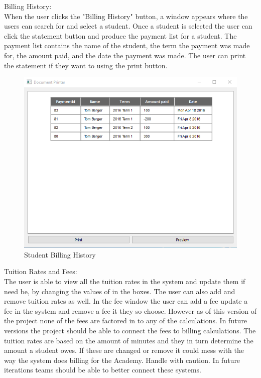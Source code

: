 Billing History:\\
When the user clicks the "Billing History" button, a window appears where the users can search for and select a student. Once a student is selected the user can click the statement button and produce the payment list for a student. The payment list contains the name of the student, the term the payment was made for, the amount paid, and the date the payment was made. The user can print the statement if they want to using the print button.  

\begin{figure}
  \includegraphics[width=\linewidth]{pics/userGuide/billHistory.png}
  \caption{Student Billing History} 
  \label{fig:User doc: Billing History}
\end{figure}

Tuition Rates and Fees:\\
The user is able to view all the tuition rates in the system and update them if need be, by changing the values of in the boxes. The user can also add and remove tuition rates as well. In the fee window the user can add a fee update a fee in the system and remove a fee it they so choose. However as of this version of the project none of the fees are factored in to any of the calculations. In future versions the project should be able to connect the fees to billing calculations. The tuition rates are based on the amount of minutes and they in turn determine the amount a student owes. If these are changed or remove it could mess with the way the system does billing for the Academy. Handle with caution. In future iterations teams should be able to better connect these systems.

